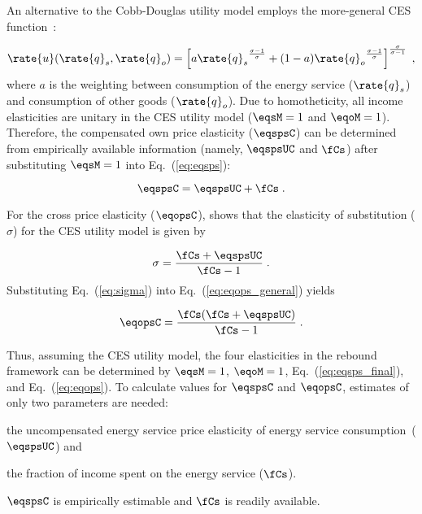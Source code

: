 An alternative to the Cobb-Douglas utility model employs
the more-general CES function~\citep{Lemoine:2020aa}:

\begin{equation}
  \rate{u}(\rate{q}_s,\rate{q}_o) =
      \left[ a {\rate{q}_s}^{\frac{\sigma-1}{\sigma}} 
            + (1-a) {\rate{q}_o}^{\frac{\sigma-1}{\sigma}} \right]
                                   ^{\frac{\sigma}{\sigma-1}} \; ,
\end{equation}
%
where $a$ is the weighting between
consumption of the energy service ($\rate{q}_s$)
and consumption of other goods ($\rate{q}_o$).
Due to homotheticity,
all income elasticities are unitary in the CES utility model
($\eqsM = 1$ and $\eqoM = 1$).
Therefore,
the compensated own price elasticity ($\eqspsC$) can be
determined from empirically available information
(namely, $\eqspsUC$ and $\fCs$)
after substituting $\eqsM = 1$ into Eq.~(\ref{eq:eqsps}):

\begin{equation} \label{eq:eqsps_final}
  \eqspsC = \eqspsUC + \fCs \; .
\end{equation}

For the cross price elasticity ($\eqopsC$),
\citet{Gortz1977} shows that
the elasticity of substitution ($\sigma$)
for the CES utility model is given by

\begin{equation} \label{eq:sigma}
  \sigma  = \frac{\fCs + \eqspsUC}{\fCs - 1} \; .
\end{equation}
%
Substituting Eq.~(\ref{eq:sigma}) into Eq.~(\ref{eq:eqops_general}) yields

\begin{equation} \label{eq:eqops}
  \eqopsC = \frac{\fCs (\fCs + \eqspsUC)}{\fCs - 1} \; .
\end{equation}

Thus, assuming the CES utility model,
the four elasticities in the rebound framework can be determined by
$\eqsM = 1$,
$\eqoM = 1$,
Eq.~(\ref{eq:eqsps_final}), and
Eq.~(\ref{eq:eqops}).
To calculate values for $\eqspsC$ and $\eqopsC$,
estimates of only two parameters are needed:
%
\begin{enumerate*}[label={(\alph*)}]

  \item the uncompensated energy service price elasticity of energy service consumption~($\eqspsUC$) and

  \item the fraction of income spent on the energy service ($\fCs$).

\end{enumerate*}
%
$\eqspsC$ is empirically estimable and $\fCs$ is readily available.
